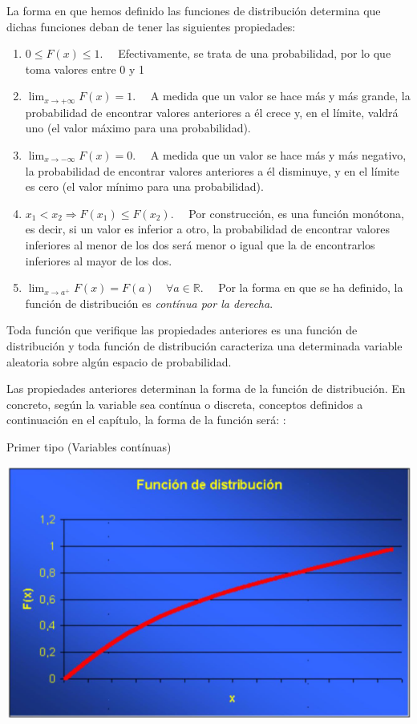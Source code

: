\documentclass[
]{article}
\begin{document}
La forma en que hemos definido las funciones de distribución determina que
dichas funciones deban de tener las siguientes propiedades:

\begin{enumerate}
\def\labelenumi{\arabic{enumi}.}
\item
  \(0 \leq F(x) \leq 1. \quad\)
  Efectivamente, se trata de una probabilidad, por lo que toma valores entre 0 y 1
\item
  \(\lim _{x \rightarrow+\infty} F(x)=1. \quad\)
  A medida que un valor se hace más y más grande, la probabilidad de encontrar valores anteriores a él crece y, en el límite, valdrá uno (el valor máximo para una probabilidad).
\item
  \(\lim _{x \rightarrow-\infty} F(x)=0. \quad\)
  A medida que un valor se hace más y más negativo, la probabilidad de encontrar valores anteriores a él disminuye, y en el límite es cero (el valor mínimo para una probabilidad).
\item
  \(x_{1}<x_{2} \Rightarrow F\left(x_{1}\right) \leq F\left(x_{2}\right). \quad\)
  Por construcción, es una función monótona, es decir, si un valor es inferior a otro, la probabilidad de encontrar valores inferiores al menor de los dos será menor o igual que la de encontrarlos inferiores al mayor de los dos.
\item
  \(\lim _{x \rightarrow a^{+}} F(x)=F(a) \quad \forall a \in \mathbb{R}. \quad\)
  Por la forma en que se ha definido, la función de distribución es \emph{contínua por la derecha}.
\end{enumerate}

Toda función que verifique las propiedades anteriores es una función de
distribución y toda función de distribución caracteriza una determinada
variable aleatoria sobre algún espacio de probabilidad.

Las propiedades anteriores determinan la forma de la función de distribución. En concreto, según la variable sea contínua o discreta, conceptos definidos a continuación en el capítulo, la forma de la función será: :

Primer tipo (Variables contínuas)

\includegraphics[width=0.9\linewidth]{images/cdfContinua}
\end{document}
